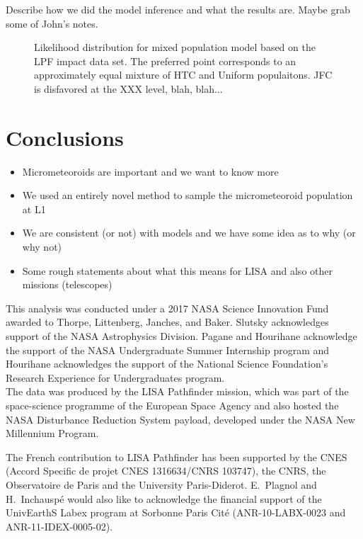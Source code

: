 \documentclass[preprint, trackchanges]{aastex61}
\begin{document}
Describe how we did the model inference and what the results are. Maybe grab some of John's notes.
\begin{figure}
\caption{Likelihood distribution for mixed population model based on the LPF impact data set. The preferred point corresponds to an approximately equal mixture of HTC and Uniform populaitons.  JFC is disfavored at the XXX level, blah, blah...\label{fig:Example}}
\end{figure}
\FloatBarrier
\section{Conclusions} \label{sec:conclusions}

\begin{itemize}
\item Micrometeoroids are important and we want to know more
\item We used an entirely novel method to sample the micrometeoroid population at L1
\item We are consistent (or not) with models and we have some idea as to why (or why not)
\item Some rough statements about what this means for LISA  and also other missions (telescopes)
\end{itemize}
\acknowledgments

This analysis was conducted under a 2017 NASA Science Innovation Fund awarded to Thorpe, Littenberg, Janches, and Baker. Slutsky acknowledges support of the NASA Astrophysics Division. Pagane and Hourihane acknowledge the support of the NASA Undergraduate Summer Internship program and Hourihane acknowledges the support of the National Science Foundation's Research Experience for Undergraduates program.
\\

The data was produced by the LISA Pathfinder mission, which was part of the
space-science programme of the European Space Agency and also hosted the NASA Disturbance Reduction System payload, developed under the NASA New Millennium Program. 

The French contribution to LISA Pathfinder has been supported by the CNES (Accord Specific de projet
CNES 1316634/CNRS 103747), the CNRS, the Observatoire de Paris and the University
Paris-Diderot. E.~Plagnol and H.~Inchausp\'{e} would also like to acknowledge the
financial support of the UnivEarthS Labex program at Sorbonne Paris Cit\'{e}
(ANR-10-LABX-0023 and ANR-11-IDEX-0005-02).
\end{document}
